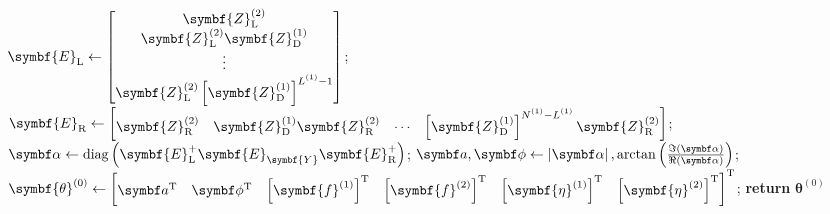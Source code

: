 \begin{algorithm}
\begin{algorithmic}[1]
       \State $
            \symbf{E}_{\text{L}} \gets
            \begin{bmatrix}
                \symbf{Z}^{(2)}_{\text{L}} \\
                \symbf{Z}^{(2)}_{\text{L}} \symbf{Z}^{(1)}_{\text{D}} \\
                \vdots\\
                \symbf{Z}^{(2)}_{\text{L}} \left[\symbf{Z}^{(1)}_{\text{D}}\right]^{\Lone - 1}
            \end{bmatrix}
        $;
        \State $
            \symbf{E}_{\text{R}} \gets
            \begin{bmatrix}
                \symbf{Z}^{(2)}_{\text{R}} &
                \symbf{Z}^{(1)}_{\text{D}} \symbf{Z}^{(2)}_{\text{R}} &
                \cdots &
                \left[\symbf{Z}^{(1)}_{\text{D}}\right]^{\None - \Lone} \symbf{Z}^{(2)}_{\text{R}}
            \end{bmatrix}
        $;
        \State $
           \bdalpha \gets \diag
           \left(
               \symbf{E}_{\text{L}}^+
               \symbf{E}_{\symbf{Y}}^{\vphantom{+}}
               \symbf{E}_{\text{R}}^+
           \right)
           $;
        \State $
            \bda, \bdphi \gets
            \left\lvert \bdalpha \right\rvert,
            \arctan \left( \frac{\Im\left(\bdalpha\right)}{\Re\left(\bdalpha\right)} \right)
        $;
        \State $\symbf{\theta}^{(0)} \gets
        \begin{bmatrix}
            \bda\T &
            \bdphi\T &
            \left[\symbf{f}^{(1)}\right]\T &
            \left[\symbf{f}^{(2)}\right]\T &
            \left[\symbf{\eta}^{(1)}\right]\T &
            \left[\symbf{\eta}^{(2)}\right]\T
        \end{bmatrix}
        ^{\mathrm{T}}$;
        \State \textbf{return} $\symbf{\theta}^{(0)}$
    \EndProcedure
    \end{algorithmic}
\end{algorithm}



